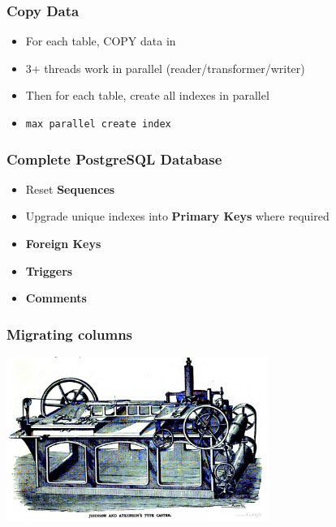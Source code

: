 \documentclass{beamer}
\begin{document}
\begin{frame}
  \frametitle{Copy Data}

  \vfill

  \begin{itemize}
  \item For each table, COPY data in
  \item 3+ threads work in parallel (reader/transformer/writer)
  \item Then for each table, create all indexes in parallel
  \item \texttt{max parallel create index}
  \end{itemize}
\end{frame}

\begin{frame}
  \frametitle{Complete PostgreSQL Database}

  \vfill

  \begin{itemize}
  \item Reset \textbf{Sequences}
  \item Upgrade unique indexes into \textbf{Primary Keys} where required
  \item \textbf{Foreign Keys}
  \item \textbf{Triggers}
  \item \textbf{Comments}
  \end{itemize}
\end{frame}

\begin{frame}
  \frametitle{Migrating columns}

  
  \begin{center}
    \includegraphics[height=2.1in]{type-casting-machine.jpg}
  \end{center}
\end{frame}
\end{document}
